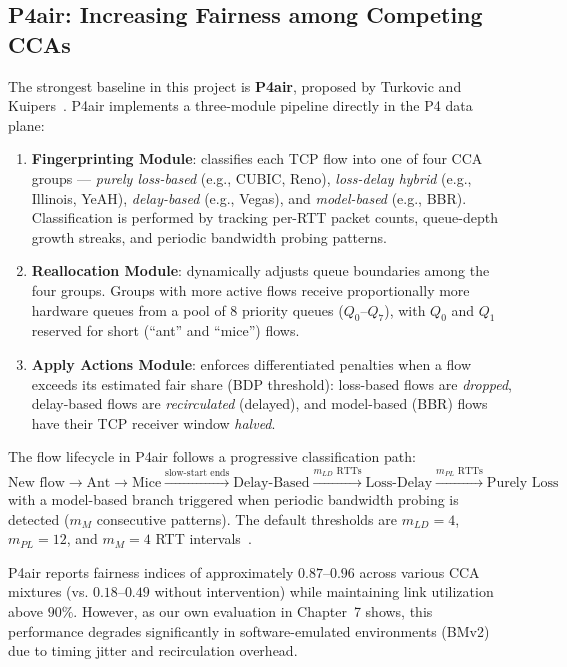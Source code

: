 \documentclass[12pt,a4paper]{report}
\begin{document}
\subsection{P4air: Increasing Fairness among Competing CCAs}
The strongest baseline in this project is \textbf{P4air}, proposed by Turkovic and Kuipers~\cite{p4air}. P4air implements a three-module pipeline directly in the P4 data plane:

\begin{enumerate}
    \item \textbf{Fingerprinting Module}: classifies each TCP flow into one of four CCA groups — \textit{purely loss-based} (e.g., CUBIC, Reno), \textit{loss-delay hybrid} (e.g., Illinois, YeAH), \textit{delay-based} (e.g., Vegas), and \textit{model-based} (e.g., BBR). Classification is performed by tracking per-RTT packet counts, queue-depth growth streaks, and periodic bandwidth probing patterns.
    \item \textbf{Reallocation Module}: dynamically adjusts queue boundaries among the four groups. Groups with more active flows receive proportionally more hardware queues from a pool of 8 priority queues ($Q_0$--$Q_7$), with $Q_0$ and $Q_1$ reserved for short (``ant'' and ``mice'') flows.
    \item \textbf{Apply Actions Module}: enforces differentiated penalties when a flow exceeds its estimated fair share (BDP threshold): loss-based flows are \textit{dropped}, delay-based flows are \textit{recirculated} (delayed), and model-based (BBR) flows have their TCP receiver window \textit{halved}.
\end{enumerate}

The flow lifecycle in P4air follows a progressive classification path:
\[
\text{New flow} \rightarrow \text{Ant} \rightarrow \text{Mice} \xrightarrow{\text{slow-start ends}} \text{Delay-Based} \xrightarrow{m_{LD} \text{ RTTs}} \text{Loss-Delay} \xrightarrow{m_{PL} \text{ RTTs}} \text{Purely Loss}
\]
with a model-based branch triggered when periodic bandwidth probing is detected ($m_M$ consecutive patterns). The default thresholds are $m_{LD}=4$, $m_{PL}=12$, and $m_M=4$ RTT intervals~\cite{p4air}.

P4air reports fairness indices of approximately $0.87$--$0.96$ across various CCA mixtures (vs. $0.18$--$0.49$ without intervention) while maintaining link utilization above $90\%$. However, as our own evaluation in Chapter~7 shows, this performance degrades significantly in software-emulated environments (BMv2) due to timing jitter and recirculation overhead.
\end{document}
